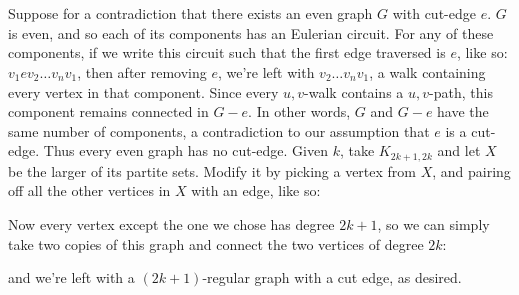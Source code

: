 \documentclass[11pt]{article}
\begin{document}
\section{} %
Suppose for a contradiction that there exists an even graph $G$ with cut-edge
$e$. $G$ is even, and so each of its components has an Eulerian circuit. For
any of these components, if we write this circuit such that the first edge
traversed is $e$, like so: $v_1ev_2\ldots v_nv_1$, then after removing $e$,
we're left with $v_2\ldots v_nv_1$, a walk containing every vertex in that
component. Since every $u,v$-walk contains a $u,v$-path, this component remains
connected in $G-e$. In other words, $G$ and $G-e$ have the same number of
components, a contradiction to our assumption that $e$ is a cut-edge. Thus
every even graph has no cut-edge.
\newline
\newline
Given $k$, take $K_{2k+1,2k}$ and let $X$ be the larger of its partite sets.
Modify it by picking a vertex from $X$, and pairing off all the other vertices
in $X$ with an edge, like so:
\newline
\newline
{}
\newline
\newline
Now every vertex except the one we chose has degree $2k+1$, so we can simply
take two copies of this graph and connect the two vertices of degree $2k$:
\newline
\newline
{}
\newline
\newline
and we're left with a $(2k+1)$-regular graph with a cut edge, as desired.
\end{document}
